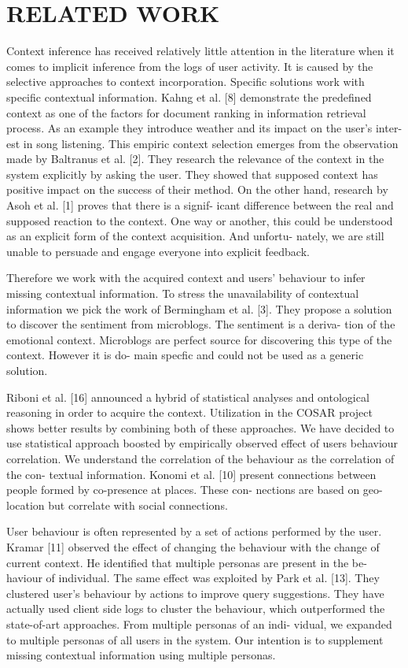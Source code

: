 \documentclass{acm_proc_article-sp} %
\begin{document}
\section{RELATED WORK}
Context inference has received relatively little attention
in the literature when it comes to implicit inference from the
logs of user activity. It is caused by the selective approaches
to context incorporation. Specific solutions work with specific contextual information. Kahng et al. [8] demonstrate
the predefined context as one of the factors for document
ranking in information retrieval process. As an example
they introduce weather and its impact on the user's inter-
est in song listening. This empiric context selection emerges
from the observation made by Baltranus et al. [2]. They research the relevance of the context in the system explicitly
by asking the user. They showed that supposed context has
positive impact on the success of their method. On the other
hand, research by Asoh et al. [1] proves that there is a signif-
icant difference between the real and supposed reaction to
the context. One way or another, this could be understood
as an explicit form of the context acquisition. And unfortu-
nately, we are still unable to persuade and engage everyone
into explicit feedback.

Therefore we work with the acquired context and users'
behaviour to infer missing contextual information. To stress
the unavailability of contextual information we pick the work
of Bermingham et al. [3]. They propose a solution to discover
the sentiment from microblogs. The sentiment is a deriva-
tion of the emotional context. Microblogs are perfect source
for discovering this type of the context. However it is do-
main specfic and could not be used as a generic solution.

Riboni et al. [16] announced a hybrid of statistical analyses and ontological reasoning in order to acquire the context. Utilization in the COSAR project shows better results
by combining both of these approaches. We have decided
to use statistical approach boosted by empirically observed
effect of users behaviour correlation. We understand the
correlation of the behaviour as the correlation of the con-
textual information. Konomi et al. [10] present connections
between people formed by co-presence at places. These con-
nections are based on geo-location but correlate with social
connections.

User behaviour is often represented by a set of actions performed by the user. Kramar [11] observed the effect of changing the behaviour with the change of current context. He identified that multiple personas are present in the be-
haviour of individual. The same effect was exploited by
Park et al. [13]. They clustered user's behaviour by actions
to improve query suggestions. They have actually used client
side logs to cluster the behaviour, which outperformed the
state-of-art approaches. From multiple personas of an indi-
vidual, we expanded to multiple personas of all users in the
system. Our intention is to supplement missing contextual
information using multiple personas.
\end{document}
